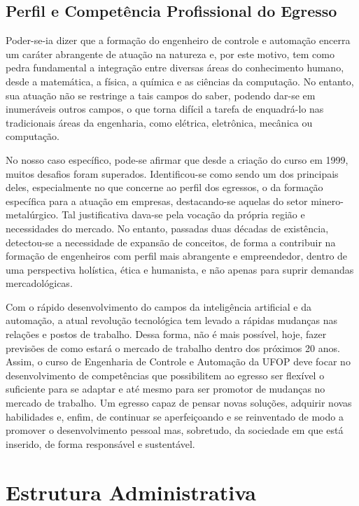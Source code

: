\documentclass[
	12pt,				%
	openright,			%
	oneside,			%
	a4paper,			%
	english,			%
	brazil				%
	]{abntex2}
\begin{document}
\section{Perfil e Competência Profissional do Egresso}
%
Poder-se-ia dizer que a formação do engenheiro de controle e automação encerra um caráter
abrangente de atuação na natureza e, por este motivo, tem como pedra fundamental a integração entre diversas áreas do conhecimento humano, desde a matemática, a física, a química e as ciências da computação. No entanto, sua atuação não se restringe a tais campos do saber, podendo dar-se em inumeráveis outros campos, o que torna difícil a tarefa de enquadrá-lo nas tradicionais áreas da engenharia, como elétrica, eletrônica, mecânica ou computação.

No nosso caso específico, pode-se afirmar que desde a criação do curso em 1999, muitos desafios foram superados. Identificou-se como sendo um dos principais deles, especialmente no que concerne ao perfil dos egressos, o da formação específica para a atuação em empresas, destacando-se aquelas do setor minero-metalúrgico. Tal justificativa dava-se pela vocação da própria região e necessidades do mercado. No entanto, passadas duas décadas de existência, detectou-se a necessidade de expansão de conceitos, de forma a contribuir na formação de engenheiros com perfil mais abrangente e empreendedor, dentro de uma perspectiva holística, ética e humanista, e não apenas para suprir demandas mercadológicas.

Com o rápido desenvolvimento do campos da inteligência artificial e da automação, a atual revolução tecnológica tem levado a rápidas mudanças nas relações e postos de trabalho. Dessa forma, não é mais possível, hoje, fazer previsões de como estará o mercado de trabalho dentro dos próximos 20 anos. Assim, o curso de Engenharia de Controle e Automação da UFOP deve focar no desenvolvimento de competências que possibilitem ao egresso ser flexível o suficiente para se adaptar e até mesmo para ser promotor de mudanças no mercado de trabalho. Um egresso capaz de pensar novas soluções, adquirir novas habilidades e, enfim, de continuar se aperfeiçoando e se reinventado de modo a promover o desenvolvimento pessoal mas, sobretudo, da sociedade em que está inserido, de forma responsável e sustentável.
%
\chapter{Estrutura Administrativa}
\label{cap:03} 
\end{document}

